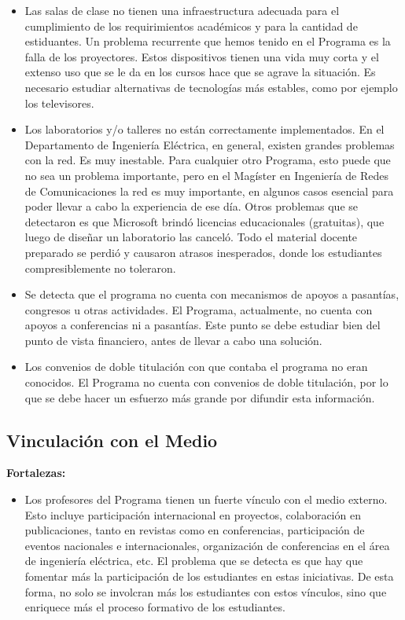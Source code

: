 \begin{itemize}
\item Las salas de clase no tienen una infraestructura adecuada para el cumplimiento de los requirimientos académicos y para la cantidad de estiduantes. Un problema recurrente que hemos tenido en el Programa es la falla de los proyectores. Estos dispositivos tienen una vida muy corta
y el extenso uso que se le da en los cursos hace que se agrave la situación. Es necesario estudiar alternativas de tecnologías más estables,
como por ejemplo los televisores. 
\item Los laboratorios y/o talleres no están correctamente implementados. En el Departamento de Ingeniería Eléctrica, en general, existen grandes problemas con la red. Es muy inestable. Para cualquier otro Programa, esto puede que no sea 
un problema importante, pero en el Magíster en Ingeniería de Redes de Comunicaciones la red es muy importante, en algunos casos esencial para poder llevar a cabo la experiencia de ese día. Otros problemas que se detectaron es que Microsoft brindó licencias educacionales (gratuitas), que luego de diseñar un laboratorio las canceló. Todo el material docente preparado se perdió y causaron atrasos inesperados, donde los estudiantes compresiblemente no toleraron.
\item Se detecta que el programa no cuenta con mecanismos de apoyos a pasantías, congresos u otras actividades. El Programa, actualmente, no cuenta con apoyos a conferencias ni a pasantías. Este punto se debe estudiar bien del punto de vista financiero, antes de llevar a cabo una solución.
\item Los convenios de doble titulación con que contaba el programa no eran conocidos. El Programa no cuenta con convenios de doble titulación, por lo que se debe hacer un esfuerzo más grande por difundir esta información. 
\end{itemize}



\subsection{Vinculación con el Medio}

\noindent\textbf{Fortalezas:}

\begin{itemize}
\item Los profesores del Programa tienen un fuerte vínculo con el medio externo. Esto incluye participación internacional en proyectos, 
colaboración en publicaciones, tanto en revistas como en conferencias, participación de eventos nacionales e internacionales, organización de 
conferencias en el área de ingeniería eléctrica, etc. El problema que se detecta es que hay que fomentar más la participación de los 
estudiantes en estas iniciativas. De esta forma, no solo se involcran más los estudiantes con estos vínculos, sino que enriquece más el proceso formativo 
de los estudiantes.
\end{itemize}


